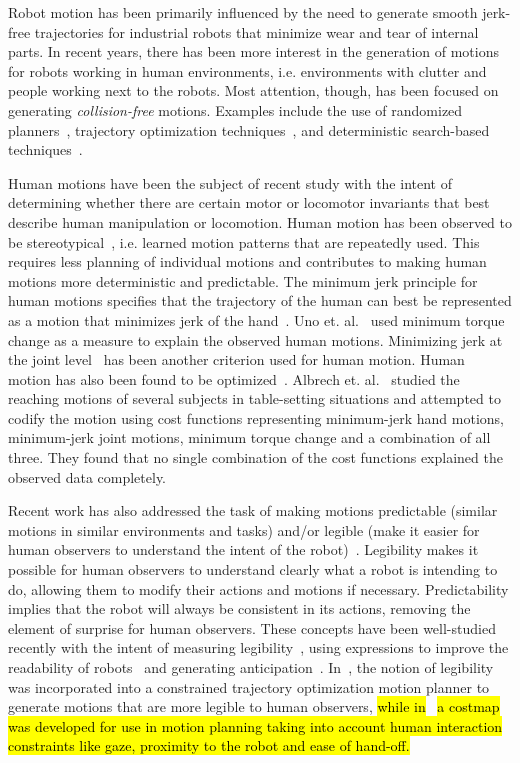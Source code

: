 \documentclass[letterpaper, 10 pt, conference]{ieeeconf}  %
\begin{document}
Robot motion has been primarily influenced by the need to generate smooth jerk-free trajectories for industrial robots that minimize wear and tear of internal parts. In recent years, there has been more interest in the generation of motions for robots working in human environments, i.e. environments with clutter and people working next to the robots. Most attention, though, has been focused on generating {\em collision-free} motions. Examples include the use of randomized planners~\cite{kuffner2000rrt}, trajectory optimization techniques~\cite{Mrinal:2011}, and deterministic search-based techniques~\cite{cohen2010search}. 

Human motions have been the subject of recent study with the intent of determining whether there are certain motor or locomotor invariants that best describe human manipulation or locomotion. Human motion has been observed to be stereotypical~\cite{Atkeson:85}, i.e. learned motion patterns that are repeatedly used. This requires less planning of individual motions and contributes to making human motions more deterministic and predictable. The minimum jerk principle for human motions specifies that the trajectory of the human can best be represented as a motion that minimizes jerk of the hand~\cite{Flash:85}. Uno et. al.~\cite{Uno:89} used minimum torque change as a measure to explain the observed human motions. Minimizing jerk at the joint level~\cite{Rosenbaum:1995} has been another criterion used for human motion. Human motion has also been found to be optimized~\cite{Arechavaleta:2006}. Albrech et. al.~\cite{Albrecht:2011} studied the reaching motions of several subjects in table-setting situations and attempted to codify the motion using cost functions representing minimum-jerk hand motions, minimum-jerk joint motions, minimum torque change and a combination of all three. They found that no single combination of the cost functions explained the observed data completely. 

Recent work has also addressed the task of making motions predictable (similar motions in similar environments and tasks) and/or legible (make it easier for human observers to understand the intent of the robot)~\cite{Beetz:2010}. Legibility makes it possible for human observers to understand clearly what a robot is intending to do, allowing them to modify their actions and motions if necessary. Predictability implies that the robot will always be consistent in its actions, removing the element of surprise for human observers. These concepts have been well-studied recently with the intent of measuring legibility~\cite{Lichtenthaler:2011}, using expressions to improve the readability of robots~\cite{Takayama:2011} and generating anticipation~\cite{Gielniak:2011}. In~\cite{Dragan:2013}, the notion of legibility was incorporated into a constrained trajectory optimization motion planner to generate motions that are more legible to human observers,\hl{ while in}~\cite{mainprice2011planning} \hl{a costmap was developed for use in motion planning taking into account human interaction constraints like gaze, proximity to the robot and ease of hand-off.}
\end{document}
